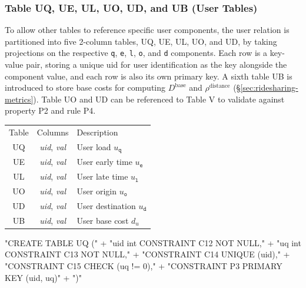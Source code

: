 \documentclass{article}
\def\nwendcode{\endtrivlist \endgroup}
\let\nwdocspar=\par
\theoremstyle{definition}
\begin{document}
\subsubsection{Table UQ, UE, UL, UO, UD, and UB (User Tables)}
To allow other tables to reference specific user components,
the user relation is partitioned into five 2-column tables, UQ, UE, UL,
UO, and UD, by taking projections on the respective \texttt{q}, \texttt{e}, \texttt{l},
\texttt{o}, and \texttt{d} components. Each row is a key-value pair,
storing a unique \textsf{uid} for user identification as the key alongside the component value,
and each row is also its own primary key.
A sixth table UB is introduced to store base costs for computing
$D^\textrm{base}$ and $\rho^\textrm{distance}$
(\S\ref{sec:ridesharing-metrics}).
Table UO and UD can be referenced to Table V to validate against
property P2 and rule P4.
\begin{table}[h]
\centering
\small
\begin{tabular}{|c|c|l|}
\hline
\rowcolor{TableTitle}
\multicolumn{3}{|c|}{User Tables}\\
\hline
\rowcolor{TableHeader}
Table & Columns & Description \\
\hline
UQ & \textit{uid}, \textit{val} & User load $u_\texttt{q}$ \\
UE & \textit{uid}, \textit{val} & User early time $u_\texttt{e}$ \\
UL & \textit{uid}, \textit{val} & User late time $u_\texttt{l}$ \\
UO & \textit{uid}, \textit{val} & User origin $u_\texttt{o}$ \\
UD & \textit{uid}, \textit{val} & User destination $u_\texttt{d}$ \\
UB & \textit{uid}, \textit{val} & User base cost $d_u$ \\
\hline
\end{tabular}
\end{table}
\nwenddocs{}\endmoddef{}
"CREATE TABLE UQ ("
  + "uid int  CONSTRAINT C12 NOT NULL,"
  + "uq  int  CONSTRAINT C13 NOT NULL,"
  + "CONSTRAINT C14 UNIQUE (uid),"
  + "CONSTRAINT C15 CHECK (uq != 0),"
  + "CONSTRAINT P3 PRIMARY KEY (uid, uq)"
  + ")"
\nwendcode{}\nwdocspar
\end{document}
